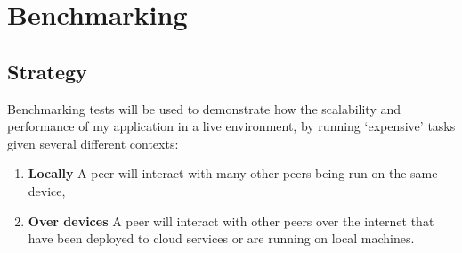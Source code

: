 \section{Benchmarking}

\subsection*{Strategy}

Benchmarking tests will be used to demonstrate how the scalability and performance of my application in a live environment, by running `expensive' tasks given several different contexts:

\begin{enumerate}
  \item \textbf{Locally} A peer will interact with many other peers being run on the same device,
  \item \textbf{Over devices} A peer will interact with other peers over the internet that have been deployed to cloud services or are running on local machines.
\end{enumerate}
